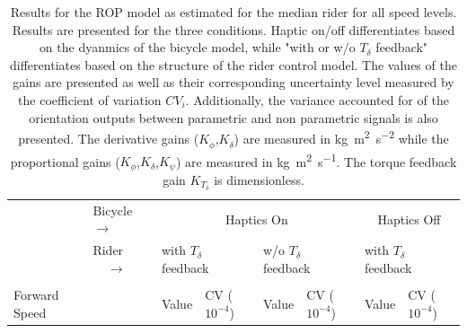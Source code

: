 \begin{table}[]
    \caption{ Results for the ROP model as estimated for the median rider for all speed levels. Results are presented for the three conditions. Haptic on/off differentiates based on the dyanmics of the bicycle model, while "with or w/o \ensuremath{T_\delta} feedback" differentiates based on the structure of the rider control model. The values of the gains are presented as well as their corresponding uncertainty level measured by the coefficient of variation \ensuremath{CV_i}. Additionally, the variance accounted for of the orientation outputs between parametric and non parametric signals is also presented. The derivative gains (\ensuremath{K_{\dot{\phi}}},\ensuremath{K_{\dot{\delta}}}) are measured in \si{\kilogram\square\meter\per\square\second} while the proportional gains (\ensuremath{K_{\phi}},\ensuremath{K_{\delta}},\ensuremath{K_{\psi}}) are measured in \si{\kilogram\square\meter\per\second}. The torque feedback gain \ensuremath{K_{T_\delta}} is dimensionless.}
    \label{tb:predict}
    \begin{tabular}{llcccccc}
    \hline
                                                   & Bicycle $\rightarrow$                                  & \multicolumn{4}{c}{Haptics On}                                                                                                                                                                          & \multicolumn{2}{c}{Haptics Off}                                                                    \\ \cline{2-8} 
                                                   & {\color[HTML]{333333} Rider $\;\;\;\;\rightarrow$} & \multicolumn{2}{l}{with $T_\delta$ feedback}                                                       & \multicolumn{2}{l}{w/o  $T_\delta$ feedback}                                                       & \multicolumn{2}{l}{with $T_\delta$ feedback}                                                       \\ \cline{2-8} 
                                                   &                                                        & \multicolumn{1}{l}{}                        & \multicolumn{1}{l}{}                                 & \multicolumn{1}{l}{}                        & \multicolumn{1}{l}{}                                 & \multicolumn{1}{l}{}                        & \multicolumn{1}{l}{}                                 \\
    \multirow{-2}{*}{Forward Speed}                &                                                        & \multicolumn{1}{l}{\multirow{-2}{*}{Value}} & \multicolumn{1}{l}{\multirow{-2}{*}{CV ($10^{-4}$)}} & \multicolumn{1}{l}{\multirow{-2}{*}{Value}} & \multicolumn{1}{l}{\multirow{-2}{*}{CV ($10^{-4}$)}} & \multicolumn{1}{l}{\multirow{-2}{*}{Value}} & \multicolumn{1}{l}{\multirow{-2}{*}{CV ($10^{-4}$)}} \\ \hline

\end{tabular}
\end{table}
